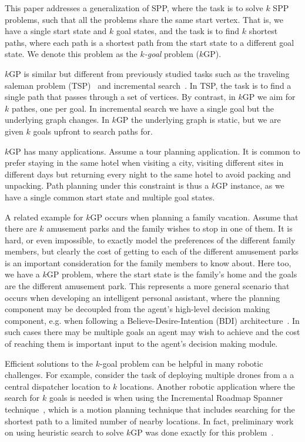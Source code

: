 \documentclass{aicom2e}
\newcommand{\kgs}{$k$GP}
\begin{document}
This paper addresses a generalization of SPP, where 
the task is to solve $k$ SPP problems, such that all the problems share the same start vertex. That is, we have a single start state and $k$ goal states, and the task is to find $k$ shortest paths, where each path is a shortest path from the start state to a different goal state. We denote this problem as the {\em $k$-goal} problem (\kgs{}). 


\kgs{} is similar but different from previously studied tasks such as the traveling saleman problem (TSP)~\cite{} and incremental search~\cite{koenig2004lifelong}. In TSP, the task is to find a single path that passes through a set of vertices. By contrast, in \kgs{} we aim for $k$ pathes, one per goal. In incremental search we have a single goal but the underlying graph changes. In \kgs{} the underlying graph is static, but we are given $k$ goals upfront to search paths for. 


\kgs{} has many applications. 
Assume a tour planning application. It is common to prefer staying in the same hotel when visiting a city, visiting different sites in different days but returning every night to the same hotel to avoid packing and unpacking. Path planning under this constraint is thus a \kgs{} instance, as we have a single common start state and multiple goal states. 

A related example for \kgs{} occurs when planning a family vacation. 
Assume that there are $k$ amusement parks and the family wishes to stop in one of them. It is hard, or even impossible, to exactly model the preferences of the different family members, but clearly the cost of getting to each of the different amusement parks is an important consideration for the family members to know about. Here too, we have a \kgs{} problem, where the start state is the family's home and the goals are the different amusement park. 
This represents a more general scenario that occurs when developing an intelligent personal assistant, where the planning component may be decoupled from the agent's high-level decision making component, e.g. when following a Believe-Desire-Intention (BDI) architecture~\cite{bratman1999intention,georgeff1998belief}. In such cases there may be multiple goals an agent may wish to achieve and the cost of reaching them is important input to the agent's decision making module. 


Efficient solutions to the $k$-goal problem can be helpful in many
robotic challenges. For example, consider the task of deploying multiple drones from a a central dispatcher location to $k$ locations. Another robotic application where the search for $k$ goals is needed is when using the Incremental Roadmap Spanner technique~\cite{marble2013asymptotically}, which is a motion planning technique that includes searching for the shortest path to a limited number of nearby locations. In fact, preliminary work on using heuristic search to solve \kgs{} was done exactly for this problem~\cite{DobsonB14}. 
\end{document}
